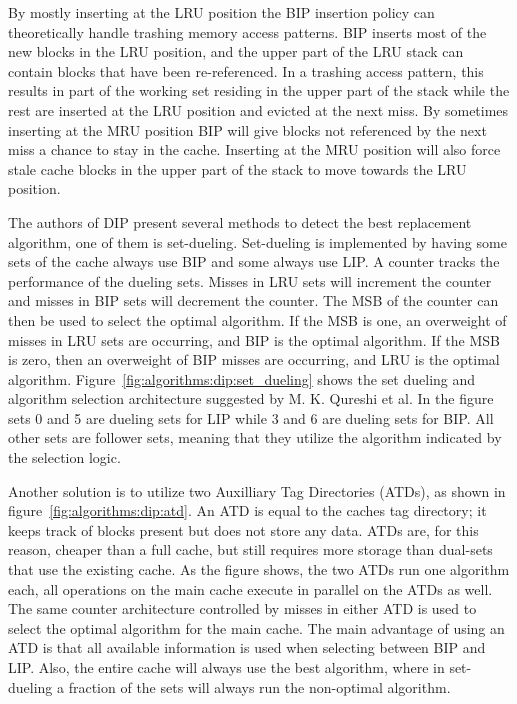 By mostly inserting at the LRU position the BIP insertion policy can theoretically handle trashing memory access patterns.
BIP inserts most of the new blocks in the LRU position, and the upper part of the LRU stack can contain blocks that have been re-referenced.
In a trashing access pattern, this results in part of the working set residing in the upper part of the stack while the rest are inserted at the LRU position and evicted at the next miss.
By sometimes inserting at the MRU position BIP will give blocks not referenced by the next miss a chance to stay in the cache. 
Inserting at the MRU position will also force stale cache blocks in the upper part of the stack to move towards the LRU position.

The authors of DIP present several methods to detect the best replacement algorithm, one of them is set-dueling.
Set-dueling is implemented by having some sets of the cache always use BIP and some always use LIP.
A counter tracks the performance of the dueling sets.
Misses in LRU sets will increment the counter and misses in BIP sets will decrement the counter.
The MSB of the counter can then be used to select the optimal algorithm.
If the MSB is one, an overweight of misses in LRU sets are occurring, and BIP is the optimal algorithm. 
If the MSB is zero, then an overweight of BIP misses are occurring, and LRU is the optimal algorithm.
Figure~\ref{fig:algorithms:dip:set_dueling} shows the set dueling and algorithm selection architecture suggested by M. K. Qureshi et al.
In the figure sets 0 and 5 are dueling sets for LIP while 3 and 6 are dueling sets for BIP.
All other sets are follower sets, meaning that they utilize the algorithm indicated by the selection logic.

Another solution is to utilize two Auxilliary Tag Directories (ATDs), as shown in figure~\ref{fig:algorithms:dip:atd}.
An ATD is equal to the caches tag directory; it keeps track of blocks present but does not store any data.
ATDs are, for this reason, cheaper than a full cache, but still requires more storage than dual-sets that use the existing cache.
As the figure shows, the two ATDs run one algorithm each, all operations on the main cache execute in parallel on the ATDs as well.
The same counter architecture controlled by misses in either ATD is used to select the optimal algorithm for the main cache.
The main advantage of using an ATD is that all available information is used when selecting between BIP and LIP.
Also, the entire cache will always use the best algorithm, where in set-dueling a fraction of the sets will always run the non-optimal algorithm.